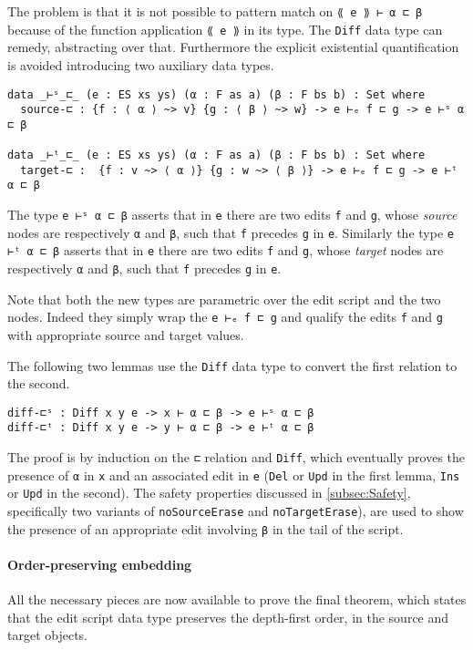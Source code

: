 \documentclass[../Thesis.tex]{subfiles}
\begin{document}
	The problem is that it is not possible to pattern match on 
	\texttt{⟪ e ⟫ ⊢ α ⊏ β} because of the function application \texttt{⟪ e ⟫}
	in its type.
	The \texttt{Diff} data type can remedy, abstracting over that.
	Furthermore the explicit existential quantification is avoided introducing
	two auxiliary data types.
	 
\begin{verbatim}
data _⊢ˢ_⊏_ (e : ES xs ys) (α : F as a) (β : F bs b) : Set where
  source-⊏ : {f : ⟨ α ⟩ ~> v} {g : ⟨ β ⟩ ~> w} -> e ⊢ₑ f ⊏ g -> e ⊢ˢ α ⊏ β 

data _⊢ᵗ_⊏_ (e : ES xs ys) (α : F as a) (β : F bs b) : Set where
  target-⊏ :  {f : v ~> ⟨ α ⟩} {g : w ~> ⟨ β ⟩} -> e ⊢ₑ f ⊏ g -> e ⊢ᵗ α ⊏ β
\end{verbatim}

	The type \texttt{e ⊢ˢ α ⊏ β} asserts that in \texttt{e} there are two
	edits \texttt{f} and \texttt{g}, whose \emph{source} nodes are respectively 
	\texttt{α} 	and \texttt{β}, such that \texttt{f} precedes \texttt{g} in \texttt{e}.
	Similarly the type \texttt{e ⊢ᵗ α ⊏ β} asserts that in \texttt{e} there are two
	edits \texttt{f} and \texttt{g}, whose \emph{target} nodes are respectively 
	\texttt{α} 	and \texttt{β}, such that \texttt{f} precedes \texttt{g} in \texttt{e}.
	
	Note that both the new types are parametric over the edit script and the 
	two nodes. Indeed they simply wrap the \texttt{e ⊢ₑ f ⊏ g} and
	qualify the edits \texttt{f} and \texttt{g} with appropriate source and
	target values.
	
	The following two lemmas use the \texttt{Diff} data type to convert
	the first relation to the second.	
\begin{verbatim}
diff-⊏ˢ : Diff x y e -> x ⊢ α ⊏ β -> e ⊢ˢ α ⊏ β
diff-⊏ᵗ : Diff x y e -> y ⊢ α ⊏ β -> e ⊢ᵗ α ⊏ β
\end{verbatim}
	The proof is by induction on the \texttt{⊏} relation and
	\texttt{Diff}, which eventually proves the presence of \texttt{α} in \texttt{x} 
	and an associated edit in \texttt{e} (\texttt{Del} or \texttt{Upd} in the first
	lemma, \texttt{Ins} or \texttt{Upd} in the second).
	The safety properties discussed in \ref{subsec:Safety}, specifically 
	two variants of \texttt{noSourceErase} and \texttt{noTargetErase}),
	are used to show the presence of an appropriate edit involving \texttt{β}
	in the tail of the script.
	
	\paragraph{Order-preserving embedding}
	All the necessary pieces are now available to prove the final theorem,
	which states that the edit script data type preserves the depth-first order,
	in the source and target objects.
\end{document}
